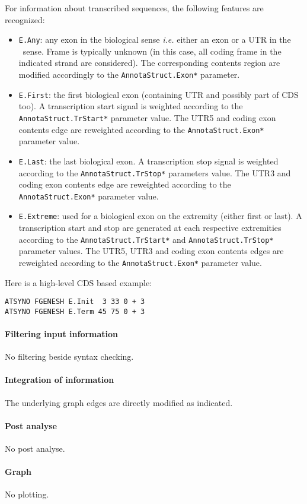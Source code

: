 For information about transcribed sequences, the following features
are recognized:
\begin{itemize}
\item \texttt{E.Any}: any exon in the biological sense \textit{i.e.}
  either an exon or a UTR in the \EuGene\ sense. Frame is typically
  unknown (in this case, all coding frame in the indicated strand are
  considered). The corresponding contents region are modified
  accordingly to the \texttt{AnnotaStruct.Exon*} parameter.
\item \texttt{E.First}: the first biological exon (containing UTR and
  possibly part of CDS too). A transcription start signal is weighted
  according to the \texttt{AnnotaStruct.TrStart*} parameter value. The
  UTR5 and coding exon contents edge are reweighted according to the
  \texttt{AnnotaStruct.Exon*} parameter value.
\item \texttt{E.Last}: the last biological exon. A transcription stop
  signal is weighted according to the \texttt{Annota\-Struct.TrStop*}
  parameters value. The UTR3 and coding exon contents edge are
  reweighted according to the \texttt{AnnotaStruct.Exon*} parameter
  value.
\item \texttt{E.Extreme}: used for a biological exon on the extremity
  (either first or last).  A transcription start and stop are
  generated at each respective extremities according to the
  \texttt{AnnotaStruct.TrStart*} and \texttt{AnnotaStruct.TrStop*}
  parameter values. The UTR5, UTR3 and coding exon contents edges are
  reweighted according to the \texttt{AnnotaStruct.Exon*} parameter
  value.
\end{itemize}


Here is a high-level CDS based example:
\begin{Verbatim}[fontsize=\small]
ATSYNO FGENESH E.Init  3 33 0 + 3
ATSYNO FGENESH E.Term 45 75 0 + 3
\end{Verbatim}


\paragraph{Filtering input information}

No filtering beside syntax checking.

\paragraph{Integration of information}

The underlying graph edges are directly modified as indicated. 

\paragraph{Post analyse}

No post analyse.

\paragraph{Graph}

No plotting.




